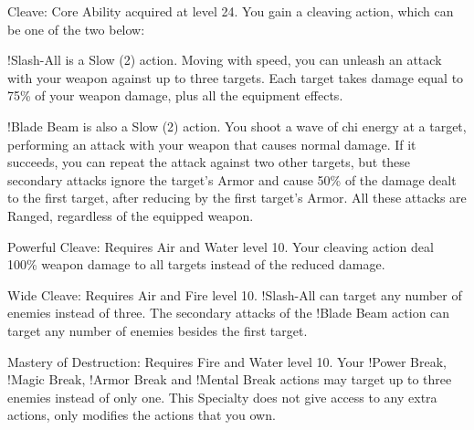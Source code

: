 \begin{ffminipage}
  Cleave: Core Ability acquired at level 24. You gain a cleaving action, which can be one of the two below:

  \begin{jobchoice}[header=false]
    !Slash-All is a Slow (2) action. Moving with speed, you can unleash an attack with your weapon against up to three targets. Each target takes damage equal to 75\% of your weapon damage, plus all the equipment effects.

    !Blade Beam is also a Slow (2) action. You shoot a wave of chi energy at a target, performing an attack with your weapon that causes normal damage. If it succeeds, you can repeat the attack against two other targets, but these secondary attacks ignore the target’s Armor and cause 50\% of the damage dealt to the first target, after reducing by the first target’s Armor. All these attacks are Ranged, regardless of the equipped weapon.
  \end{jobchoice}

  \begin{jobchoice}
    Powerful Cleave: Requires Air and Water level 10. Your cleaving action deal 100\% weapon damage to all targets instead of the reduced damage.

    Wide Cleave: Requires Air and Fire level 10. !Slash-All can target any number of enemies instead of three. The secondary attacks of the !Blade Beam action can target any number of enemies besides the first target.

    Mastery of Destruction: Requires Fire and Water level 10. Your !Power Break, !Magic Break, !Armor Break and !Mental Break actions may target up to three enemies instead of only one. This Specialty does not give access to any extra actions, only modifies the actions that you own.
  \end{jobchoice}
\end{ffminipage}

